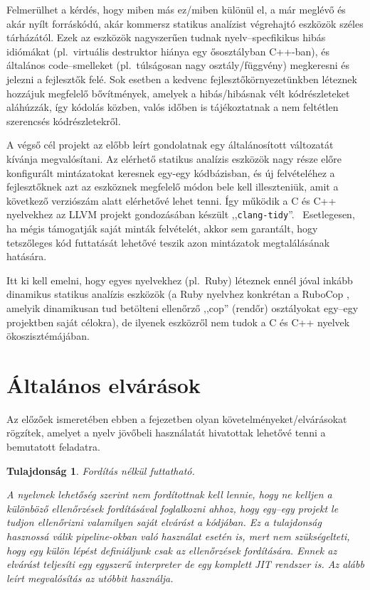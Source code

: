 \documentclass[magyar,12pt,a4paper,final,titlepage]{report}
\newtheorem{property}{Tulajdonság}
\def\pl{pl.\ }
\begin{document}
    Felmerülhet a kérdés, hogy miben más ez/miben különül el, a már meglévő és akár nyílt forráskódú, akár kommersz statikus analízist végrehajtó eszközök széles tárházától.
    Ezek az eszközök nagyszerűen tudnak nyelv--specfikikus hibás idiómákat (\pl virtuális destruktor hiánya egy ősosztályban C++-ban), és általános code--smelleket (\pl túlságosan nagy osztály/függvény) megkeresni és jelezni a fejlesztők felé.
    Sok esetben a kedvenc fejlesztőkörnyezetünkben léteznek hozzájuk megfelelő bővítmények, amelyek a hibás/hibásnak vélt kódrészleteket aláhúzzák, így kódolás közben, valós időben is tájékoztatnak a nem feltétlen szerencsés kódrészletekről.

    A végső cél projekt az előbb leírt gondolatnak egy általánosított változatát kívánja megvalósítani.
    Az elérhető statikus analízis eszközök nagy része előre konfigurált mintázatokat keresnek egy-egy kódbázisban, és új felvételéhez a fejlesztőknek azt az eszköznek megfelelő módon bele kell illeszteniük, amit a következő verziószám alatt elérhetővé lehet tenni.
    Így működik a C és C++ nyelvekhez az LLVM projekt gondozásában készült ,,{\tt clang-tidy}''.~\cite{llvm_project_getting_nodate}
    Esetlegesen, ha mégis támogatják saját minták felvételét, akkor sem garantált, hogy tetszőleges kód futtatását lehetővé teszik azon mintázatok megtalálásának hatására.

    Itt ki kell emelni, hogy egyes nyelvekhez (\pl Ruby) léteznek ennél jóval inkább dinamikus statikus analízis eszközök (a Ruby nyelvhez konkrétan a RuboCop \cite{rubocop_project_development_nodate}, amelyik dinamikusan tud betölteni ellenőrző ,,cop'' (rendőr) osztályokat egy--egy projektben saját célokra), de ilyenek eszközről nem tudok a C és C++ nyelvek ökoszisztémájában.

    \section{Általános elvárások}

    Az előzőek ismeretében ebben a fejezetben olyan követelményeket/elvárásokat rögzítek, amelyet a nyelv jövőbeli használatát hivatottak lehetővé tenni a bemutatott feladatra.

    \begin{property}\label{prop:uncompiled}
        Fordítás nélkül futtatható.

        \noindent A nyelvnek lehetőség szerint nem fordítottnak kell lennie, hogy ne kelljen a különböző ellenőrzések fordításával foglalkozni ahhoz, hogy egy--egy projekt le tudjon ellenőrizni valamilyen saját elvárást a kódjában.
        Ez a tulajdonság hasznossá válik pipeline-okban való használat esetén is, mert nem szükségelteti, hogy egy külön lépést definiáljunk csak az ellenőrzések fordítására.
        Ennek az elvárást teljesíti egy egyszerű interpreter de egy komplett \gls{JIT} rendszer is.
        Az alább leírt megvalósítás az utóbbit használja.
    \end{property}
\end{document}
